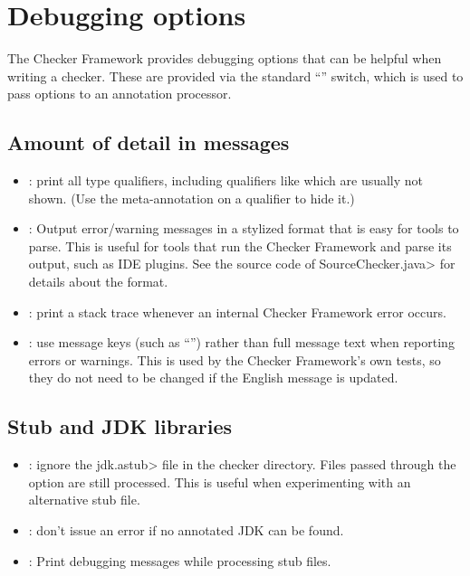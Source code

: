 \section{Debugging options\label{debugging-options}}

The Checker Framework provides debugging options that can be helpful when
writing a checker. These are provided via the standard  ``''
switch, which is used to pass options to an annotation processor.


\subsection{Amount of detail in messages\label{debugging-options-detail}}

\begin{itemize}
\item {}: print all type qualifiers, including
qualifiers like  which are usually not shown.
(Use the  meta-annotation on a qualifier to hide it.)

\item {}: Output error/warning messages in a
  stylized format that is easy for tools to parse.  This is useful for
  tools that run the Checker Framework and parse its output, such as IDE
  plugins.  See the source code of \<SourceChecker.java> for details about
  the format.

\item {}: print a stack trace whenever an
internal Checker Framework error occurs.

\item {}: use message keys (such as ``'')
rather than full message text when reporting errors or warnings.  This is
used by the Checker Framework's own tests, so they do not need to be
changed if the English message is updated.

\end{itemize}

\subsection{Stub and JDK libraries\label{debugging-options-libraries}}

\begin{itemize}

\item {}:
  ignore the \<jdk.astub> file in the checker directory. Files passed
  through the  option are still processed. This is useful
  when experimenting with an alternative stub file.

\item {}:
  don't issue an error if no annotated JDK can be found.

\item {}:
  Print debugging messages while processing stub files.

\end{itemize}

